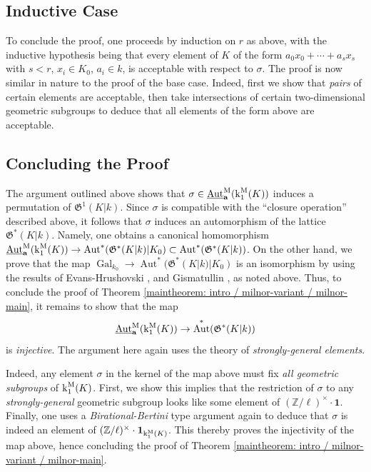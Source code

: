 \documentclass[11pt]{amsart}
\theoremstyle{definition}
\theoremstyle{remark}
\numberwithin{equation}{section}
\DeclareMathOperator{\Aut}{Aut}
\DeclareMathOperator{\Gal}{Gal}
\newcommand{\Z}{\mathbb{Z}}
\newcommand{\abf}{\mathbf{a}}
\newcommand{\Gfrak}{\mathfrak{G}}
\newcommand{\UAutm}{\underline{\Aut}^{\rm M}}
\renewcommand{\k}{\operatorname{k}^{\rm M}}
\newcommand{\one}{\mathbf{1}}
\newcommand{\Galk}{{\Gal_{k_0}}}
\begin{document}
\subsection{Inductive Case}

To conclude the proof, one proceeds by induction on $r$ as above, with the inductive hypothesis being that every element of $K$ of the form $a_0 x_0 + \cdots + a_s x_s$ with $s < r$, $x_i \in K_0$, $a_i \in k$, is acceptable with respect to $\sigma$.
The proof is now similar in nature to the proof of the base case.
Indeed, first we show that \emph{pairs} of certain elements are acceptable, then take intersections of certain two-dimensional geometric subgroups to deduce that all elements of the form above are acceptable.

\subsection{Concluding the Proof}

The argument outlined above shows that $\sigma \in \UAutm_\abf(\k_1(K))$ induces a permutation of $\Gfrak^1(K|k)$.
Since $\sigma$ is compatible with the ``closure operation'' described above, it follows that $\sigma$ induces an automorphism of the lattice $\Gfrak^*(K|k)$.
Namely, one obtains a canonical homomorphism $\UAutm_\abf(\k_1(K)) \rightarrow \Aut^*(\Gfrak^*(K|k)|K_0) \subset \Aut^*(\Gfrak^*(K|k))$.
On the other hand, we prove that the map $\Galk \rightarrow \Aut^*(\Gfrak^*(K|k)|K_0)$ is an isomorphism by using the results of {\sc Evans-Hrushovski} \cite{Evans:1991}, \cite{Evans:1995} and {\sc Gismatullin} \cite{Gismatullin:2008}, as noted above.
Thus, to conclude the proof of Theorem \ref{maintheorem: intro / milnor-variant / milnor-main}, it remains to show that the map
\[ \UAutm_\abf(\k_1(K)) \rightarrow \Aut^*(\Gfrak^*(K|k)) \]
is \emph{injective}.
The argument here again uses the theory of \emph{strongly-general elements}.

Indeed, any element $\sigma$ in the kernel of the map above must fix \emph{all geometric subgroups} of $\k_1(K)$.
First, we show this implies that the restriction of $\sigma$ to any \emph{strongly-general} geometric subgroup looks like some element of $(\Z/\ell)^\times \cdot \one$.
Finally, one uses a \emph{Birational-Bertini} type argument again to deduce that $\sigma$ is indeed an element of $(\Z/\ell)^\times \cdot \one_{\k_1(K)}$.
This thereby proves the injectivity of the map above, hence concluding the proof of Theorem \ref{maintheorem: intro / milnor-variant / milnor-main}.
\end{document}

